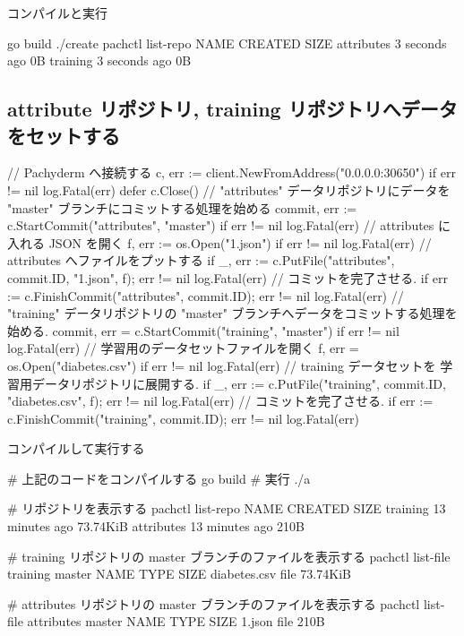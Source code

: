 \documentclass[mingoth,a4paper]{jsarticle}
\begin{document}
コンパイルと実行
\begin{commandline}
go build
./create
pachctl list-repo
NAME CREATED SIZE
attributes 3 seconds ago 0B
training 3 seconds ago 0B
\end{commandline}

\subsection{attribute リポジトリ, training リポジトリへデータをセットする}

\begin{commandline}
// Pachyderm へ接続する
c, err := client.NewFromAddress("0.0.0.0:30650")
if err != nil {
log.Fatal(err)
}
defer c.Close()
// "attributes" データリポジトリにデータを "master" ブランチにコミットする処理を始める
commit, err := c.StartCommit("attributes", "master")
if err != nil {
log.Fatal(err)
}
// attributes に入れる JSON を開く
f, err := os.Open("1.json")
if err != nil {
log.Fatal(err)
}
// attributes へファイルをプットする
if _, err := c.PutFile("attributes", commit.ID, "1.json", f); err != nil {
log.Fatal(err)
}
// コミットを完了させる.
if err := c.FinishCommit("attributes", commit.ID); err != nil {
log.Fatal(err)
}
// "training" データリポジトリの "master" ブランチへデータをコミットする処理を始める.
commit, err = c.StartCommit("training", "master")
if err != nil {
log.Fatal(err)
}
// 学習用のデータセットファイルを開く
f, err = os.Open("diabetes.csv")
if err != nil {
log.Fatal(err)
}
// training データセットを 学習用データリポジトリに展開する.
if _, err := c.PutFile("training", commit.ID, "diabetes.csv", f); err !=
nil {
log.Fatal(err)
}
// コミットを完了させる.
if err := c.FinishCommit("training", commit.ID); err != nil {
log.Fatal(err)
}
\end{commandline}

コンパイルして実行する
\begin{commandline}
# 上記のコードをコンパイルする
go build
# 実行
./a

# リポジトリを表示する
pachctl list-repo
NAME CREATED SIZE
training 13 minutes ago 73.74KiB
attributes 13 minutes ago 210B

# training リポジトリの master ブランチのファイルを表示する
pachctl list-file training master
NAME TYPE SIZE
diabetes.csv file 73.74KiB

# attributes リポジトリの master ブランチのファイルを表示する
pachctl list-file attributes master
NAME TYPE SIZE
1.json file 210B
\end{commandline}
\end{document}
